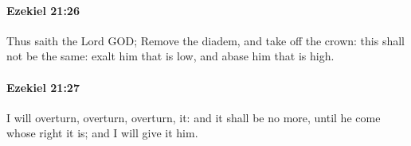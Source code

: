 		\paragraph{Ezekiel 21:26} %
			\label{EZEKIEL-21-26}

			Thus saith the Lord GOD; Remove the diadem, and take off the crown: this shall not be the same: exalt him that is low, and abase him that is high.


		\paragraph{Ezekiel 21:27} %
			\label{EZEKIEL-21-27}

			I will overturn, overturn, overturn, it: and it shall be no more, until he come whose right it is; and I will give it him.


